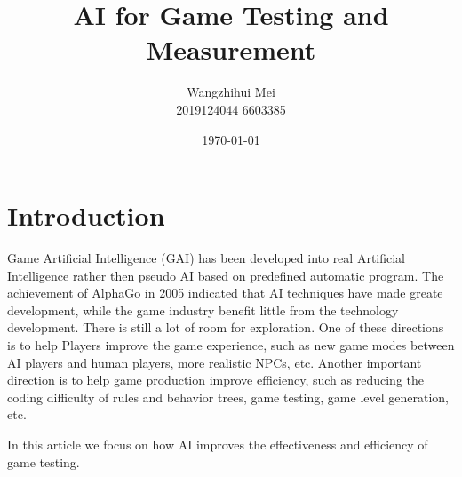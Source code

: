 \documentclass[11pt,en,authoryear]{elegantpaper}
\title{ AI for Game Testing and Measurement}
\author{Wangzhihui Mei \\ 2019124044 6603385}
\institute{UOW-CCNU JI}
\date{\today}
\begin{document}
\maketitle

 


\section{Introduction}
\noindent
Game Artificial Intelligence (GAI) has been developed into real Artificial Intelligence rather then pseudo AI based on predefined automatic program. The achievement of AlphaGo in 2005 indicated that AI techniques have made greate development, while the game industry benefit little from the technology development. There is still a lot of room for exploration. One of these directions is to help Players improve the game experience, such as new game modes between AI players and human players, more realistic NPCs, etc. Another important direction is to help game production improve efficiency, such as reducing the coding difficulty of rules and behavior trees, game testing, game level generation, etc. 
 
\noindent
In this article we focus on how AI improves the effectiveness and efficiency of game testing. 
\end{document}
